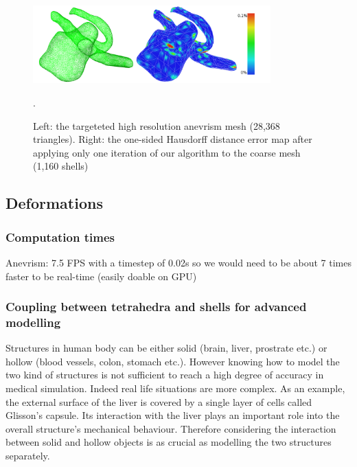 \documentclass{llncs}
\begin{document}
\begin{figure}
\centering
\includegraphics[height=3cm]{images/resultsAnevrism}
\caption {Left: the targeteted high resolution anevrism mesh (28,368 triangles). Right: the one-sided Hausdorff distance error map after applying only one iteration of our algorithm to the coarse mesh (1,160 shells)}.
\label{fig-anevrism}
\end{figure}



\subsection{Deformations}

\subsubsection{Computation times}

Anevrism: 7.5 FPS with a timestep of 0.02s so we would need to be about 7 times faster to be real-time (easily doable on GPU)

\subsubsection{Coupling between tetrahedra and shells for advanced modelling}

Structures in human body can be either solid (brain, liver, prostrate etc.) or hollow (blood vessels, colon, stomach etc.). However knowing how to model the two kind of structures is not sufficient to reach a high degree of accuracy in medical simulation. Indeed real life situations are more complex. As an example, the external surface of the liver is covered by a single layer of cells called Glisson's capsule. Its interaction with the liver plays an important role into the overall structure's mechanical behaviour. Therefore considering the interaction between solid and hollow objects is as crucial as modelling the two structures separately. 
\end{document}
